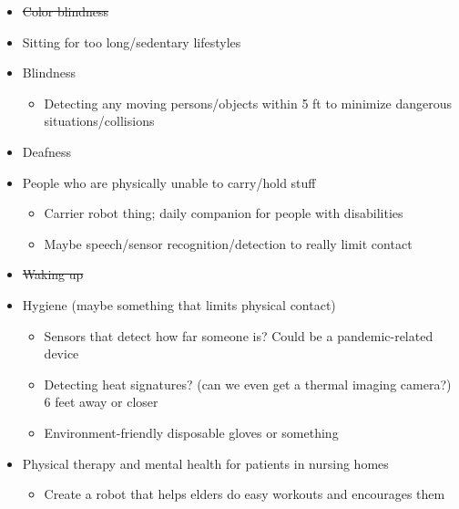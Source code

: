 \documentclass{article}
\begin{document}
\begin{itemize}
\begin{itemize}
  \end{itemize}
  \item \sout{Color blindness}
  \item Sitting for too long/sedentary lifestyles
  \item Blindness
    \begin{itemize}
      \item Detecting any moving persons/objects within 5 ft to minimize dangerous situations/collisions
    \end{itemize}
  \item Deafness
  \item People who are physically unable to carry/hold stuff
  \begin{itemize}
    \item Carrier robot thing; daily companion for people with disabilities
    \item Maybe speech/sensor recognition/detection to really limit contact
  \end{itemize}
  \item \sout{Waking up}
  \item Hygiene (maybe something that limits physical contact)
  \begin{itemize}
    \item Sensors that detect how far someone is? Could be a pandemic-related device
    \item Detecting heat signatures? (can we even get a thermal imaging camera?) 6 feet away or closer
    \item Environment-friendly disposable gloves or something
  \end{itemize}
  \item Physical therapy and mental health for patients in nursing homes
  \begin{itemize}
    \item Create a robot that helps elders do easy workouts and encourages them
  \end{itemize}
\end{itemize}
\end{document}
